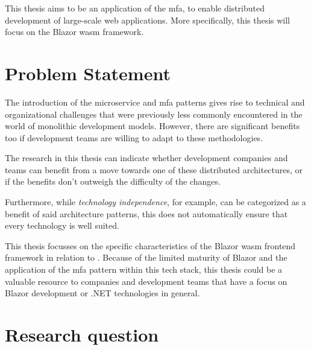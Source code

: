 This thesis aims to be an application of the \gls{mfa}, to enable distributed
development of large-scale web applications. More specifically, this thesis will
focus on the Blazor
\gls{wasm} framework.

\section{Problem Statement}
\label{sec:problem-statement}


The introduction of the \gls{microservice} and \gls{mfa} patterns gives rise to
technical and organizational challenges that were previously less commonly
encountered in the world of \gls{monolithic} development models. However, there
are significant benefits too if development teams are willing to adapt to these
methodologies. 

The research in this thesis can indicate whether development companies and teams
can benefit from a move towards one of these distributed architectures, or if
the benefits don't outweigh the difficulty of the changes.

Furthermore, while \textit{technology independence}, for example, can be
categorized as a benefit of said architecture patterns, this does not
automatically ensure that every technology is well suited. 

This thesis focusses on the specific characteristics of the Blazor \gls{wasm}
\gls{frontend} framework in relation to . Because of
the limited maturity of Blazor and the application of the \gls{mfa} pattern
within this tech stack, this thesis could be a valuable resource to companies
and development teams that have a focus on Blazor development or .NET
technologies in general.

\section{Research question}
\label{sec:research-question}

